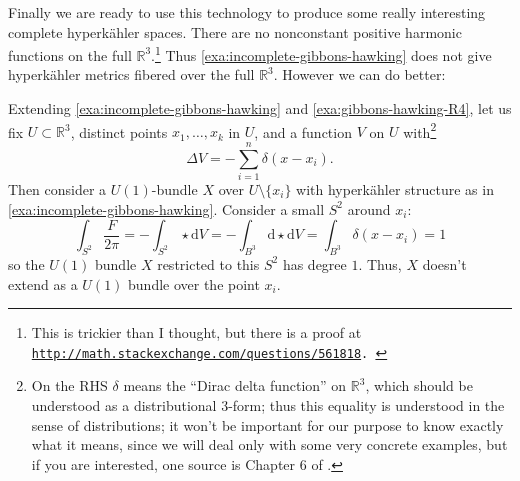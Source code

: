 \documentclass[12pt,letterpaper,reqno]{article}
\numberwithin{equation}{section}
\newcommand{\R}{\ensuremath{\mathbb R}}
\newcommand{\hk}{hyperk\"ahler\xspace}
\newcommand{\de}{\mathrm{d}}
\begin{document}
Finally we are ready to use this technology to 
produce some really interesting complete \hk spaces.
There are no 
nonconstant positive harmonic functions on the full $\R^3$.\footnote{
This is trickier than I thought, but there is a proof 
at \tt\href{http://math.stackexchange.com/questions/561818}{http://math.stackexchange.com/questions/561818}.
}
Thus \autoref{exa:incomplete-gibbons-hawking} does not give
\hk metrics fibered over the full $\R^3$.
However we can do better:

\begin{example} \label{exa:gibbons-hawking}
Extending \autoref{exa:incomplete-gibbons-hawking}
and \autoref{exa:gibbons-hawking-R4},
let us fix $U \subset \R^3$, 
distinct points $x_1, \dots, x_k$ in $U$,
and a function $V$ on $U$ with\footnote{On the RHS $\delta$ means
the ``Dirac delta function'' on $\R^3$, 
which should be understood
as a distributional 3-form; thus this 
equality is understood in the sense 
of distributions; it won't be important for our purpose to 
know exactly what it means, since we will deal only with
some very concrete examples, but if you are interested,
one source is Chapter 6 of \cite{MR1817225}.}
\begin{equation}
  \Delta V = - \sum_{i=1}^n \delta(x - x_i).
\end{equation}
Then consider a $U(1)$-bundle $X$ over $U \setminus \{x_i\}$ 
with \hk structure as in \autoref{exa:incomplete-gibbons-hawking}.
Consider a small $S^2$ around $x_i$:
\begin{equation}
  \int_{S^2} \frac{F}{2\pi} = -\int_{S^2} \star \de V = -\int_{B^3} \de \star \de V = \int_{B^3} \delta(x - x_i) = 1
\end{equation}
so the $U(1)$ bundle $X$ restricted to this $S^2$ has 
degree $1$. Thus, $X$ doesn't extend as a $U(1)$ bundle
over the point $x_i$.


\end{example}
\end{document}
